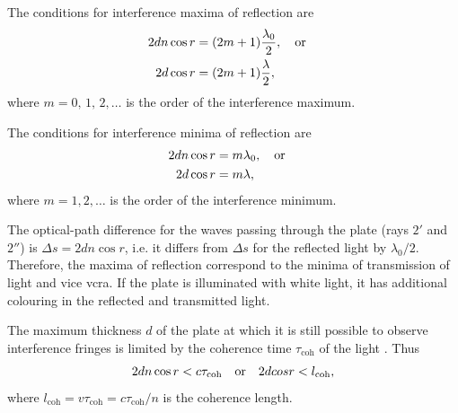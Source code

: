 The conditions for interference maxima of reflection are
\begin{align*}%
2dn \cos r & = (2m + 1) \frac{\lambda_{0}}{2}, \qor \\
2d \cos r & = (2m + 1) \frac{\lambda}{2},
\end{align*}
where $m = 0,\, 1,\, 2, \dots$ is the order of the interference maximum.

The conditions for interference minima of reflection are
\begin{align*}%
2dn \cos r & = m \lambda_{0}, \qor \\
2d \cos r & = m \lambda,
\end{align*}
where $m = 1,2, \dots{}$ is the order of the interference minimum.

The optical-path difference for the waves passing through the
plate (rays $\mathit{2}'$ and $\mathit{2}''$) is $\Delta s = 2dn \cos r$, i.e. it differs from $\Delta s$ for the reflected light by $\lambda_{0}/2$. Therefore, the maxima of reflection correspond to the minima of transmission of light and vice vcra. If the plate is illuminated with white light, it has additional colouring in the reflected and transmitted light.

The maximum thickness $d$ of the plate at which it is still possible to observe interference fringes is limited by the coherence time $\tau_{\text{coh}}$ of the light . Thus
\begin{equation*}%
2dn \cos r < c \tau_{\text{coh}} \qor 2d cos r < l_{\text{coh}},
\end{equation*}
where $l_{\text{coh}} = v \tau_{\text{coh}} = c \tau_{\text{coh}}/n$ is the coherence length.

